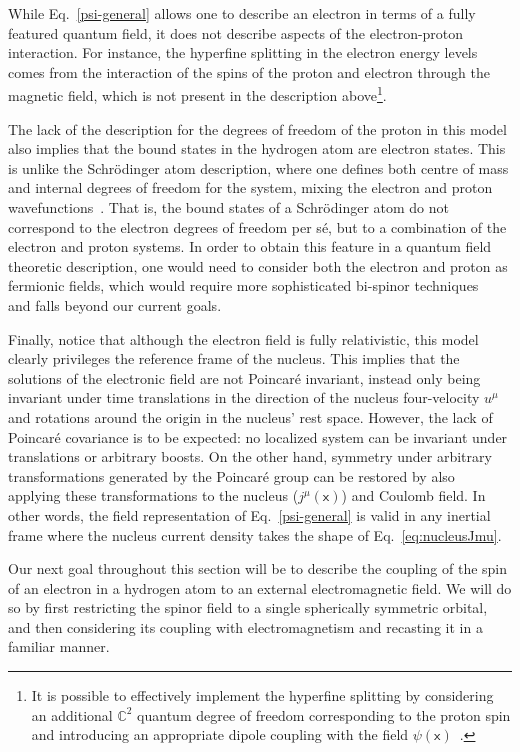 \documentclass[letterpaper,12pt,titlepage,oneside,final]{book}
\newcommand{\mf}{\mathsf}%
\begin{document}
While Eq.~\eqref{psi-general} allows one to describe an electron in terms of a fully featured quantum field, it does not describe aspects of the electron-proton interaction. For instance, the hyperfine splitting in the electron energy levels comes from the interaction of the spins of the proton and electron through the magnetic field, which is not present in the description above\footnote{It is possible to effectively implement the hyperfine splitting by considering an additional $\mathbb{C}^2$ quantum degree of freedom corresponding to the proton spin and introducing an appropriate dipole coupling with the field $\psi(\mf x)$~\cite{RQMgreiner}.}. 

The lack of the description for the degrees of freedom of the proton in this model also implies that the bound states in the hydrogen atom are electron states. This is unlike the Schr\"odinger atom description, where one defines both centre of mass and internal degrees of freedom for the system, mixing the electron and proton wavefunctions~\cite{richard}. That is, the bound states of a Schr\"odinger atom do not correspond to the electron degrees of freedom per s\'e, but to a combination of the electron and proton systems. In order to obtain this feature in a quantum field theoretic description, one would need to consider both the electron and proton as fermionic fields, which would require more sophisticated bi-spinor techniques~\cite{bispinorQED} and falls beyond our current goals.

{
Finally, notice that although the electron field is fully relativistic, this model clearly privileges the reference frame of the nucleus. This implies that the solutions of the electronic field are not Poincar\'e invariant, instead only being invariant under time translations in the direction of the nucleus four-velocity $u^\mu$ and rotations around the origin in the nucleus' rest space. However, the lack of Poincar\'e covariance is to be expected: no localized system can be invariant under translations or arbitrary boosts. On the other hand, symmetry under arbitrary transformations generated by the Poincar\'e group can be restored by also applying these transformations to the nucleus ($j^\mu(\mf x)$) and Coulomb field. In other words, the field representation of Eq.~\eqref{psi-general} is valid in any inertial frame where the nucleus current density takes the shape of Eq.~\eqref{eq:nucleusJmu}. 
}

Our next goal throughout this section will be to describe the coupling of the spin of an electron in a hydrogen atom to an external electromagnetic field. We will do so by first restricting the spinor field to a single spherically symmetric orbital, and then considering its coupling with electromagnetism and recasting it in a familiar manner.
\end{document}
